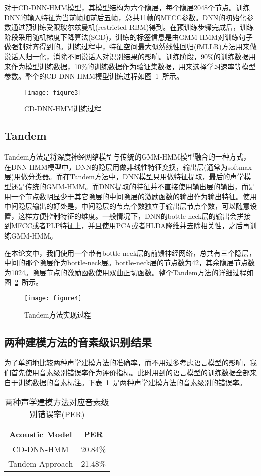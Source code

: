 对于CD-DNN-HMM模型，其模型结构为六个隐层，每个隐层2048个节点。训练DNN的输入特征为当前帧加前后五帧，总共11帧的MFCC参数。DNN的初始化参数通过预训练受限玻尔兹曼机(restricted RBM)得到。在预训练步骤完成后，训练阶段采用随机梯度下降算法(SGD)，训练的标签信息是由GMM-HMM对训练句子做强制对齐得到的。训练过程中，特征空间最大似然线性回归(fMLLR)方法用来做说话人归一化，消除不同说话人对识别结果的影响。训练阶段，90\%的训练数据用来作为模型训练数据，10\%的训练数据作为验证集数据，用来选择学习速率等模型参数。整个的CD-DNN-HMM模型训练过程如图~\ref{fig:figure3}~所示。
\begin{figure}[htbp]
\centering
\texttt{[image: figure3]}
\caption{CD-DNN-HMM训练过程}\label{fig:figure3}
\vspace{\baselineskip}
\end{figure}

\subsection{Tandem}
Tandem方法是将深度神经网络模型与传统的GMM-HMM模型融合的一种方式，在DNN-HMM模型中，DNN的隐层用做非线性特征变换，输出层(通常为softmax层)用做分类器。而在Tandem方法中，DNN模型只用做特征提取，最后的声学模型还是传统的GMM-HMM。而DNN提取的特征并不直接使用输出层的输出，而是用一个节点数明显少于其它隐层的中间隐层的激励函数的输出作为输出特征。使用中间隐层输出的好处是，中间隐层的节点个数独立于输出层节点个数，可以随意设置，这样方便控制特征的维度。一般情况下，DNN的bottle-neck层的输出会拼接到MFCC或者PLP特征上，并且使用PCA或者HLDA降维并去除相关性，之后再训练GMM-HMM。

在本论文中，我们使用一个带有bottle-neck层的前馈神经网络，总共有三个隐层，中间的那个隐层作为bottle-neck层。bottle-neck层的节点数为42，其余隐层节点数为1024。隐层节点的激励函数使用双曲正切函数。整个Tandem方法的详细过程如图~\ref{fig:figure4}~所示。
\begin{figure}[htbp]
\centering
\texttt{[image: figure4]}
\caption{Tandem方法实现过程}\label{fig:figure4}
\vspace{\baselineskip}
\end{figure}

\subsection{两种建模方法的音素级识别结果}
为了单纯地比较两种声学建模方法的准确率，而不用过多考虑语言模型的影响，我们首先使用音素级别错误率作为评价指标。此时用到的语言模型的训练数据全部来自于训练数据的音素标注。下表~\ref{tab:table2}~是两种声学建模方法的音素级别的错误率。
\begin{table}[htbp]
\caption{两种声学建模方法对应音素级别错误率(PER)}\label{tab:table2}
\vspace{0.5em}\centering\wuhao
\begin{tabular}{cc}
\toprule[1.5pt]
Acoustic Model & PER \\
\midrule[1pt]
 CD-DNN-HMM & 20.84\% \\
Tandem Approach & 21.48\% \\
\bottomrule[1.5pt]
\end{tabular}
\vspace{\baselineskip}
\end{table}

